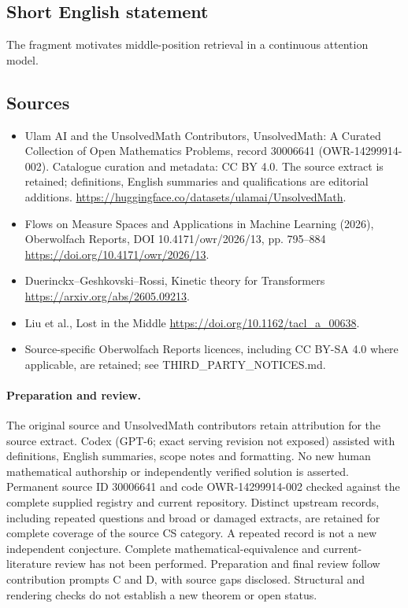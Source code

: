 \documentclass[11pt]{article}
\begin{document}
\subsection{Short English statement}
The fragment motivates middle-position retrieval in a continuous attention model.
\subsection{Sources}
\begin{itemize}
\item[S1] Ulam AI and the UnsolvedMath Contributors, UnsolvedMath: A Curated Collection of Open Mathematics Problems, record 30006641 (OWR-14299914-002). Catalogue curation and metadata: CC BY 4.0. The source extract is retained; definitions, English summaries and qualifications are editorial additions.
\url{https://huggingface.co/datasets/ulamai/UnsolvedMath}.
\item[S2] Flows on Measure Spaces and Applications in Machine Learning (2026), Oberwolfach Reports, DOI 10.4171/owr/2026/13, pp. 795--884
\url{https://doi.org/10.4171/owr/2026/13}.
\item[S3] Duerinckx--Geshkovski--Rossi, Kinetic theory for Transformers
\url{https://arxiv.org/abs/2605.09213}.
\item[S4] Liu et al., Lost in the Middle
\url{https://doi.org/10.1162/tacl_a_00638}.
\item Source-specific Oberwolfach Reports licences, including CC BY-SA 4.0 where applicable, are retained; see THIRD\_PARTY\_NOTICES.md.
\end{itemize}
\paragraph{Preparation and review.}
The original source and UnsolvedMath contributors retain attribution for the source extract. Codex (GPT-6; exact serving revision not exposed) assisted with definitions, English summaries, scope notes and formatting. No new human mathematical authorship or independently verified solution is asserted. Permanent source ID 30006641 and code OWR-14299914-002 checked against the complete supplied registry and current repository. Distinct upstream records, including repeated questions and broad or damaged extracts, are retained for complete coverage of the source CS category. A repeated record is not a new independent conjecture. Complete mathematical-equivalence and current-literature review has not been performed. Preparation and final review follow contribution prompts C and D, with source gaps disclosed. Structural and rendering checks do not establish a new theorem or open status.
\label{end:30006641}
\end{document}
